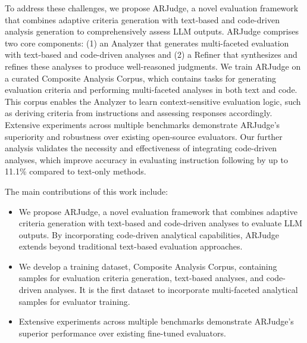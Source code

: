 To address these challenges, we propose ARJudge, a novel evaluation framework that combines adaptive criteria generation with text-based and code-driven analysis generation to comprehensively assess LLM outputs. ARJudge comprises two core components: (1) an Analyzer that generates multi-faceted evaluation with text-based and code-driven analyses and (2) a Refiner that synthesizes and refines these analyses to produce well-reasoned judgments. 
We train ARJudge on a curated Composite Analysis Corpus, which contains tasks for generating evaluation criteria and performing multi-faceted analyses in both text and code. This corpus enables the Analyzer to learn context-sensitive evaluation logic, such as deriving criteria from instructions and assessing responses accordingly. Extensive experiments across multiple benchmarks demonstrate ARJudge’s superiority and robustness over existing open-source evaluators. Our further analysis validates the necessity and effectiveness of integrating code-driven analyses, which improve accuracy in evaluating instruction following by up to 11.1\% compared to text-only methods. 

The main contributions of this work include:
\begin{itemize}
	\item We propose ARJudge, a novel evaluation framework that combines adaptive criteria generation with text-based and code-driven analyses to evaluate LLM outputs. By incorporating code-driven analytical capabilities, ARJudge extends beyond traditional text-based evaluation approaches.
	\item We develop a training dataset, Composite Analysis Corpus, containing samples for evaluation criteria generation, text-based analyses, and code-driven analyses. It is the first dataset to incorporate multi-faceted analytical samples for evaluator training.
	\item Extensive experiments across multiple benchmarks demonstrate ARJudge’s superior performance over existing fine-tuned evaluators.
\end{itemize}
